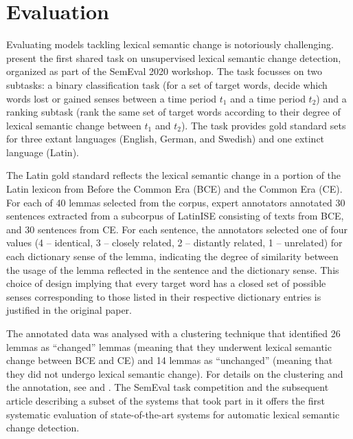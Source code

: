\documentclass[output=paper]{langscibook}
\begin{document}
\section{Evaluation}\largerpage
\label{sec:evaluation}
Evaluating models tackling lexical semantic change is notoriously challenging. 
\citet{schlechtweg-etal-2020-semeval} present the first shared task on unsupervised lexical semantic change detection, organized as part of the SemEval 2020 workshop. The task focusses on two subtasks:  a binary classification task (for a set of target words, decide which words lost or gained senses
between a time period $t_{1}$ and a time period $t_{2}$) and a ranking subtask (rank the same set of target words according to their degree of lexical semantic change between $t_{1}$ and $t_{2}$).
The task provides gold standard sets for three extant languages (English, German, and Swedish) and one extinct language (Latin).

The Latin gold standard reflects the lexical semantic change in a portion of the Latin lexicon from Before the Common Era (BCE) and the Common Era (CE). For each of 40 lemmas selected from the corpus, expert annotators annotated 30 sentences extracted from a subcorpus of LatinISE consisting of texts from BCE, and 30 sentences from CE. For each sentence, the annotators selected one of four values (4 -- identical, 3 -- closely related, 2 -- distantly related, 1 -- unrelated) for each dictionary sense of the lemma, indicating the degree of similarity between the usage of the lemma reflected in the sentence and the dictionary sense. This choice of design implying that every target word has a closed set of possible senses corresponding to those listed in their respective dictionary entries is justified in the original paper.

The annotated data was analysed with a clustering technique that identified 26 lemmas as ``changed'' lemmas (meaning that they underwent lexical semantic change between BCE and CE) and 14 lemmas as ``unchanged'' (meaning that they did not undergo lexical semantic change). For details on the clustering and the annotation, see \citet{schlechtweg-etal-2020-semeval} and \citet{schlechtweg2021dwug}. The SemEval task competition and the subsequent article describing a subset of the systems that took part in it offers the first systematic evaluation of state-of-the-art systems for automatic lexical semantic change detection. 


\end{document}
